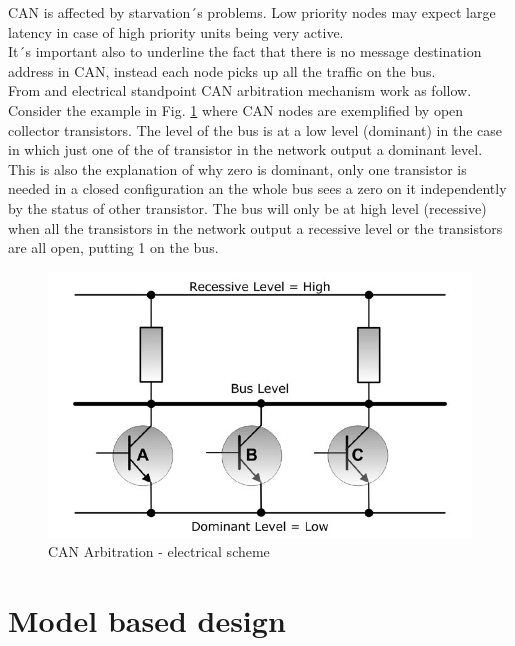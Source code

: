 \documentclass[../main.tex]{subfiles}
\begin{document}
\gls{CAN} is affected by starvation´s problems. Low priority nodes may expect large latency in case of high priority units being very active. \\
It´s important also to underline the fact that there is no message destination address in \gls{CAN}, instead each node picks up all the traffic on the bus.\\
From and electrical standpoint \gls{CAN} arbitration mechanism work as follow. Consider the example in Fig. \ref{fig:CANABRELT} where \gls{CAN} nodes are exemplified by open collector transistors. 
The level of the bus is at a low level (dominant) in the case in which just one of the of transistor in the network output a dominant level. This is also the explanation of why zero is dominant, only one transistor is needed in a closed configuration an the whole bus sees a zero on it independently by the status of other transistor. The bus will only be at high level (recessive) when all the transistors in the network output a recessive level or the transistors are all open, putting 1 on the \gls{bus}.
\begin{figure}[ht]
    \centering
    \includegraphics[width=0.7\linewidth]{images_folder/controller-area-network-can-bus-bus-arbitration-3.jpg}
    \caption{CAN Arbitration -  electrical scheme}
    \label{fig:CANABRELT}
\end{figure}

\section{Model based design}
\end{document}
